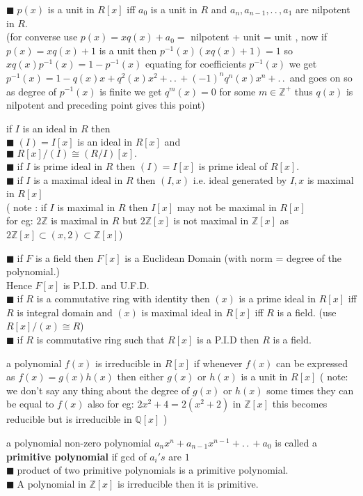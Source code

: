 \documentclass[11pt]{extarticle}
\newcommand{\Z}{\mathbb{Z}}
\newcommand{\Q}{\mathbb{Q}}
\newcommand{\ck}{.\,.\,}
\newcommand{\snote}[1]{{\footnotesize(#1)}}
\newcommand{\tbx}[2][]{
	\begin{tcolorbox}[enhanced,breakable,size=small,colback=black!2!white,title={#1},arc is angular, arc=1.5mm,drop fuzzy shadow]
		#2
	\end{tcolorbox}
}
\newcommand{\y}{$\blacksquare\;$}
\begin{document}
\begin{multicols}{2}
{			\y $ p(x) $ is a unit in $ R[x] $ iff $ a_0 $ is a unit in $ R $ and $ a_n,a_{n-1},\ck, a_1 $ are nilpotent in $ R. $ \\
			\snote{for converse use $ p(x)=xq(x)+a_0= $ nilpotent + unit = unit , now if $ p(x) = x q(x)+1$ is a unit then 
				$ p^{-1}(x)(xq(x)+1)=1 $ so $ xq(x)p^{-1}(x)=1-p^{-1}(x) $ equating for coefficients  $ p^{-1}(x) $ we get $ p^{-1}(x)=1-q(x)x+q^2(x)x^2+\ck +(-1)^{n}q^n(x)x^n+\ck $ and goes on so as degree of $ p^{-1}(x) $ is finite we get $ q^m(x)=0 $ for some $ m\in \Z^+ $ thus $ q(x) $ is nilpotent and preceding point gives this point} 
			} 
\tbx[Ideals in Polynomial rings ]{if $ I $ is an ideal in $ R $ then\\
	\y $ (I)= I[x] $ is an ideal in $ R[x] $ and\\
	\y	$ R[x]/(I)\cong (R/I)[x]. $\\
\y if $ I $ is prime ideal in $ R $ then $ (I) =I[x]$ is prime ideal of $ R[x]. $\\
\y if $ I $ is a maximal ideal in $ R $ then $ (I,x) $ i.e. ideal generated by $ I,x $ is maximal in $ R[x] $\\
			\snote{ note : if $ I $ is maximal in $ R $ then $ I[x] $ may not be maximal in $ R[x] $\\
				for eg:  $ 2\Z $ is maximal in $ R $ but $ 2\Z[x] $ is not maximal in $ \Z[x] $ as $ 2\Z[x] \subset (x,2) \subset \Z[x]$}
			} 
\tbx[Characterisation of Poly rings ]{
	\y if $ F $ is a field then $ F[x] $ is a Euclidean Domain \snote{with norm = degree of the polynomial.}\\
			Hence $ F[x] $ is P.I.D. and U.F.D.\\
\y if $R  $ is a commutative ring with identity then $ (x )$ is a prime ideal in $ R[x] $ iff $ R $ is integral domain and $ (x) $ is maximal ideal in $ R[x] $ iff $ R $ is a field. \snote{use $ R[x]/(x)\cong R $}\\
\y if $ R $ is commutative ring such that $ R[x] $ is a P.I.D then $ R $ is a field.
			} 
\tbx[Irreducibility]{a polynomial $ f(x) $ is irreducible in $ R[x] $ if whenever $ f(x) $ can be expressed as $ f(x)=g(x)h(x) $ then either $ g(x) $ or $ h(x) $ is a unit in $ R[x] $ \snote{ note: we don't say any thing about the degree of $ g(x) $ or $ h(x) $ some times they can be equal to $ f(x) $ also for eg: $ 2x^2+4=2(x^2+2) $ in $ \Z[x] $ this becomes reducible but is irreducible in $ \Q[x] $ }}
 
\tbx[Primitive Polynomial]{a polynomial non-zero polynomial $ a_nx^n+a_{n-1}x^{n-1}+\ck +a_0 $ is called a \textbf{primitive polynomial} if gcd of $ a_i's $ are $ 1 $\\
\y product of two primitive polynomials is a primitive polynomial.\\
\y A polynomial in $ \Z[x] $ is irreducible then it is primitive.}
 

\end{multicols}
\end{document}
